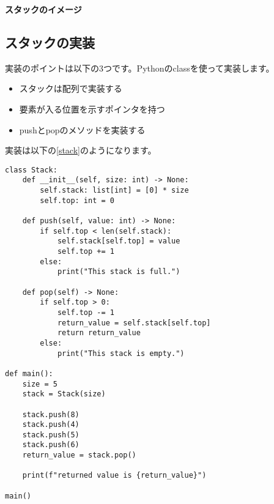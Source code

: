 \documentclass{jlreq}
\begin{document}
\vspace{0.5cm}
\begin{center}
	\textbf{スタックのイメージ}
\end{center}
\vspace{0.5cm}

\subsection{スタックの実装}
実装のポイントは以下の3つです。Pythonのclassを使って実装します。
\begin{itemize}
	\item スタックは配列で実装する
	\item 要素が入る位置を示すポインタを持つ
	\item pushとpopのメソッドを実装する
\end{itemize}

実装は以下の\ref{stack}のようになります。

\begin{lstlisting}[caption=スタックの実装, label=stack, frame=TRBL, label={stack}]
	class Stack:
    def __init__(self, size: int) -> None:
        self.stack: list[int] = [0] * size
        self.top: int = 0
    
    def push(self, value: int) -> None:
        if self.top < len(self.stack):
            self.stack[self.top] = value
            self.top += 1
        else:
            print("This stack is full.")
    
    def pop(self) -> None:
        if self.top > 0:
            self.top -= 1
            return_value = self.stack[self.top]
            return return_value
        else:
            print("This stack is empty.")

def main():
    size = 5
    stack = Stack(size)
    
    stack.push(8)
    stack.push(4)
    stack.push(5)
    stack.push(6)
    return_value = stack.pop()
    
    print(f"returned value is {return_value}")
    
main()

\end{lstlisting}
\end{document}
